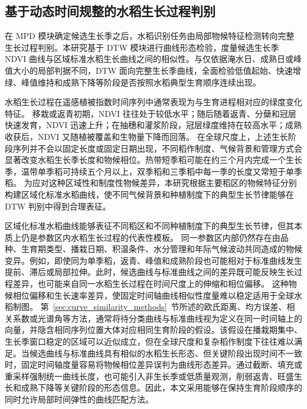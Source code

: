 \subsection{基于动态时间规整的水稻生长过程判别}
\label{sec:dtw}

在 MPD 模块确定候选生长季之后，水稻识别任务由局部物候特征检测转向完整生长过程判别。本研究基于 DTW 模块进行曲线形态检验，度量候选生长季 NDVI 曲线与区域标准水稻生长曲线之间的相似性。与仅依据淹水日、成熟日或峰值大小的局部判据不同，DTW 面向完整生长季曲线，全面检验低值起始、快速增绿、峰值维持和成熟下降等阶段是否按照水稻典型生育顺序连续出现。

水稻生长过程在遥感植被指数时间序列中通常表现为与生育进程相对应的绿度变化特征。
移栽或返青初期，NDVI 往往处于较低水平；随后随着返青、分蘖和冠层快速发育，NDVI 迅速上升；在抽穗和灌浆阶段，冠层绿度维持在较高水平；成熟收获后，NDVI 又随植被覆盖和生物量下降而回落。
在全球尺度上，上述生长阶段序列并不会以固定长度或固定日期出现，不同稻作制度、气候背景和管理方式会显著改变水稻生长季长度和物候相位。热带短季稻可能在约三个月内完成一个生长季，温带单季稻可持续五个月以上，双季稻和三季稻中每一季的长度又常短于单季稻\cite{Laborte2017SciData,Mishra2021IJAEO}。
为应对这种区域性和制度性物候差异，本研究根据主要稻区的物候特征分别构建区域化标准水稻曲线，使不同气候背景和种植制度下的典型生长节律能够在 DTW 判别中得到合理表征。

区域化标准水稻曲线能够表征不同稻区和不同种植制度下的典型生长节律，但其本质上仍是参数区内水稻生长过程的代表性模板。
同一参数区内部仍然存在由品种、生育期类型、播栽日期、积温条件、水分管理和年际气候波动共同造成的物候变异。例如，即使同为单季稻，返青、峰值和成熟阶段也可能相对于标准曲线发生提前、滞后或局部拉伸。此时，候选曲线与标准曲线之间的差异既可能反映生长过程差异，也可能来自同一水稻生长过程在时间尺度上的伸缩和相位偏移。
这种物候相位偏移和生长速率差异，使固定时间轴曲线相似性度量难以稳定适用于全球水稻制图。
第~\ref{sec:curve_similarity_methods}~节所述的欧氏距离、均方误差、相关系数或光谱角等方法，通常将待分类曲线与标准曲线视为定义在同一时间轴上的向量，并隐含相同序列位置大体对应相同生育阶段的假设。该假设在播栽期集中、生长季窗口稳定的区域可以近似成立，但在全球尺度和复杂稻作制度下往往难以满足。当候选曲线与标准曲线具有相似的水稻生长形态、但关键阶段出现时间不一致时，固定时间轴度量容易将物候相位差异误判为曲线形态差异。通过截断、填充或重采样强制统一曲线长度，也可能引入非生长季或低质量观测，削弱返青、旺盛生长和成熟下降等关键阶段的形态信息。因此，本文采用能够在保持生育阶段顺序的同时允许局部时间弹性的曲线匹配方法。

